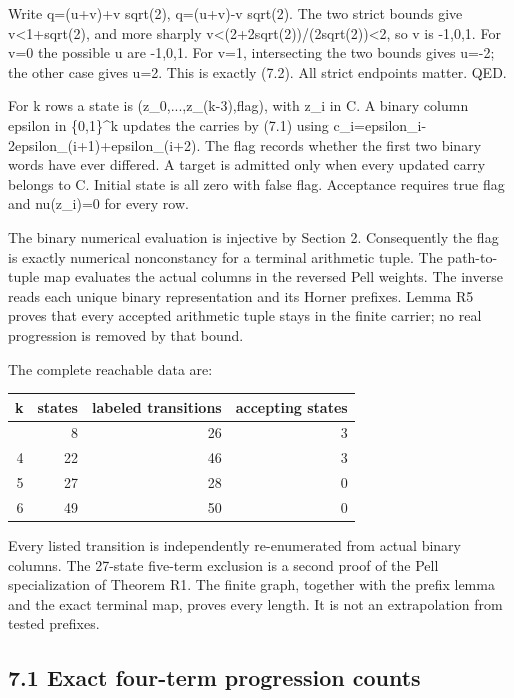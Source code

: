 Write q=(u+v)+v sqrt(2), q\textquotesingle=(u+v)-v sqrt(2). The two strict bounds give \textbar v\textbar\textless1+sqrt(2), and more sharply \textbar v\textbar\textless(2+2sqrt(2))/(2sqrt(2))\textless2, so v is -1,0,1. For v=0 the possible u are -1,0,1. For v=1, intersecting the two bounds gives u=-2; the other case gives u=2. This is exactly (7.2). All strict endpoints matter. QED.

For k rows a state is (z\_0,...,z\_(k-3),flag), with z\_i in C. A binary column epsilon in \{0,1\}\^{}k updates the carries by (7.1) using c\_i=epsilon\_i-2epsilon\_(i+1)+epsilon\_(i+2). The flag records whether the first two binary words have ever differed. A target is admitted only when every updated carry belongs to C. Initial state is all zero with false flag. Acceptance requires true flag and nu(z\_i)=0 for every row.

The binary numerical evaluation is injective by Section 2. Consequently the flag is exactly numerical nonconstancy for a terminal arithmetic tuple. The path-to-tuple map evaluates the actual columns in the reversed Pell weights. The inverse reads each unique binary representation and its Horner prefixes. Lemma R5 proves that every accepted arithmetic tuple stays in the finite carrier; no real progression is removed by that bound.

The complete reachable data are:

\begin{longtable}[]{@{}rrrr@{}}
\toprule\noalign{}
k & states & labeled transitions & accepting states \\
\midrule\noalign{}
\endhead
\bottomrule\noalign{}
\endlastfoot
3 & 8 & 26 & 3 \\
4 & 22 & 46 & 3 \\
5 & 27 & 28 & 0 \\
6 & 49 & 50 & 0 \\
\end{longtable}

Every listed transition is independently re-enumerated from actual binary columns. The 27-state five-term exclusion is a second proof of the Pell specialization of Theorem R1. The finite graph, together with the prefix lemma and the exact terminal map, proves every length. It is not an extrapolation from tested prefixes.

\subsection{7.1 Exact four-term progression counts}\label{n14-exact-four-term-progression-counts}

